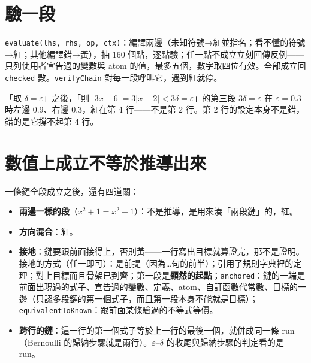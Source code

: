 \documentclass[11pt,a4paper,oneside]{book}
\renewcommand{\_}{\ifmmode\origunderscore\else\textunderscore\allowbreak\fi}
\newcommand{\code}[1]{\texttt{#1}}
\begin{document}
\section{驗一段}
\code{evaluate(lhs, rhs, op, ctx)}：編譯兩邊（未知符號→紅並指名；看不懂的符號→紅；其他編譯錯→黃），抽 160 個點，逐點驗；任一點不成立立刻回傳反例——只列使用者宣告過的變數與 atom 的值，最多五個，數字取四位有效。全部成立回 \code{checked} 數。\code{verifyChain} 對每一段呼叫它，遇到紅就停。

\begin{example}[$\delta$ 取錯]
「取 $\delta = \varepsilon$」之後，「則 $|3x-6| = 3|x-2| < 3\delta = \varepsilon$」的第三段 $3\delta = \varepsilon$ 在 $\varepsilon = 0.3$ 時左邊 0.9、右邊 0.3，紅在第 4 行——不是第 2 行。第 2 行的設定本身不是錯，錯的是它撐不起第 4 行。
\end{example}

\section{數值上成立不等於推導出來}
一條鏈全段成立之後，還有四道關：
\begin{itemize}
  \item \textbf{兩邊一樣的段}（$x^2+1 = x^2+1$）：不是推導，是用來湊「兩段鏈」的，紅。
  \item \textbf{方向混合}：紅。
  \item \textbf{接地}：鏈要跟前面接得上，否則黃——一行寫出目標就算證完，那不是證明。接地的方式（任一即可）：是前提（因為…句的前半）；引用了規則字典裡的定理；對上目標而且骨架已到齊；第一段是\textbf{顯然的起點}；\code{anchored}：鏈的一端是前面出現過的式子、宣告過的變數、定義、atom、自訂函數代常數、目標的一邊（只認多段鏈的第一個式子，而且第一段本身不能就是目標）；\code{equivalentToKnown}：跟前面某條驗過的不等式等價。
  \item \textbf{跨行的鏈}：這一行的第一個式子等於上一行的最後一個，就併成同一條 run（Bernoulli 的歸納步驟就是兩行）。$\varepsilon$–$\delta$ 的收尾與歸納步驟的判定看的是 run。
\end{itemize}
\end{document}
